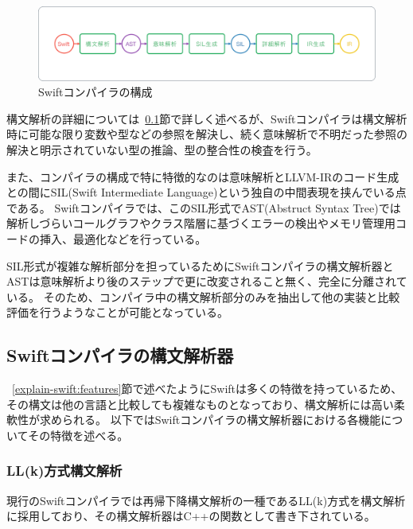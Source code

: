 \begin{figure}
    \begin{center}
        \includegraphics[scale=0.30]{./img/swift_compile_process}
        \caption{Swiftコンパイラの構成}
        \label{img:swift-compile-process}
    \end{center}
\end{figure}

構文解析の詳細については~\ref{explain-swift:structure:parser}節で詳しく述べるが、Swiftコンパイラは構文解析時に可能な限り変数や型などの参照を解決し、続く意味解析で不明だった参照の解決と明示されていない型の推論、型の整合性の検査を行う。

また、コンパイラの構成で特に特徴的なのは意味解析とLLVM-IRのコード生成との間にSIL(Swift Intermediate Language)という独自の中間表現を挟んでいる点である。
Swiftコンパイラでは、このSIL形式でAST(Abstruct Syntax Tree)では解析しづらいコールグラフやクラス階層に基づくエラーの検出やメモリ管理用コードの挿入、最適化などを行っている。

SIL形式が複雑な解析部分を担っているためにSwiftコンパイラの構文解析器とASTは意味解析より後のステップで更に改変されること無く、完全に分離されている。
そのため、コンパイラ中の構文解析部分のみを抽出して他の実装と比較評価を行うようなことが可能となっている。


\subsection{Swiftコンパイラの構文解析器}
\label{explain-swift:structure:parser}

~\ref{explain-swift:features}節で述べたようにSwiftは多くの特徴を持っているため、その構文は他の言語と比較しても複雑なものとなっており、構文解析には高い柔軟性が求められる。
以下ではSwiftコンパイラの構文解析器における各機能についてその特徴を述べる。

\subsubsection{LL(k)方式構文解析}

現行のSwiftコンパイラでは再帰下降構文解析の一種であるLL(k)方式を構文解析に採用しており、その構文解析器はC++の関数として書き下されている。

